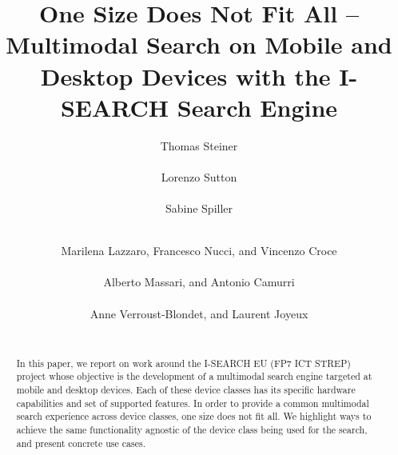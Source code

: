 \documentclass{sig-alternate}
\begin{document}
\title{One Size Does Not Fit All -- Multimodal Search on Mobile and Desktop Devices with the \mbox{I-SEARCH} Search Engine}

\author{
\alignauthor
Thomas Steiner\\
	\\
\alignauthor
Lorenzo Sutton\\
	\\
\alignauthor
Sabine Spiller\\ 	
	\\
\and	
\alignauthor	
Marilena Lazzaro, Francesco Nucci, and Vincenzo Croce\\
	\\
\alignauthor
Alberto Massari, and Antonio Camurri\\
	\\
\alignauthor	
Anne Verroust-Blondet, and Laurent Joyeux\\
	\\
}


\maketitle

\begin{abstract}
In this paper, we report on work around the \mbox{I-SEARCH} EU (FP7 ICT STREP) project whose objective is the development of a multimodal search engine targeted at mobile and desktop devices.
Each of these device classes has its specific hardware capabilities and set of supported features.
In order to provide a common multimodal search experience across device classes, one size does not fit all.
We highlight ways to achieve the same functionality agnostic of the device class being used for the search, and present concrete use cases.
\end{abstract}
\end{document}
